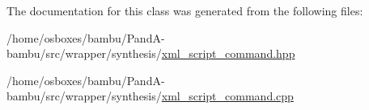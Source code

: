 The documentation for this class was generated from the following files\+:\begin{DoxyCompactItemize}
\item 
/home/osboxes/bambu/\+Pand\+A-\/bambu/src/wrapper/synthesis/\hyperlink{xml__script__command_8hpp}{xml\+\_\+script\+\_\+command.\+hpp}\item 
/home/osboxes/bambu/\+Pand\+A-\/bambu/src/wrapper/synthesis/\hyperlink{xml__script__command_8cpp}{xml\+\_\+script\+\_\+command.\+cpp}\end{DoxyCompactItemize}
